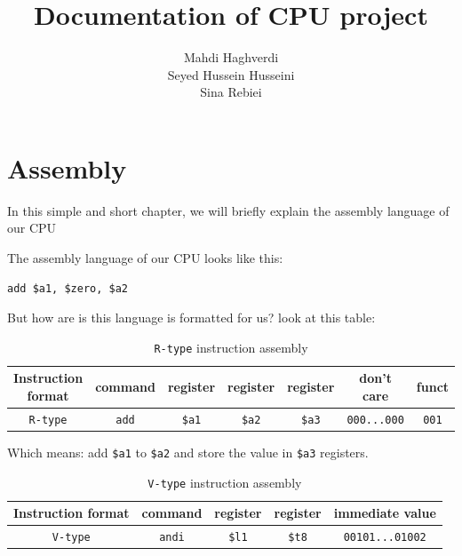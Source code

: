 \documentclass[12pt, dvipsnames, svgnames, x11names, oneside]{book}
\title{Documentation of CPU project}
\author{
Mahdi Haghverdi \\
Seyed Hussein Husseini \\
Sina Rebiei
}
\newenvironment{sansserif}{\sffamily}{\normalfont}
\begin{document}
\maketitle
\frontmatter
\tableofcontents
\mainmatter

\chapter{Assembly}
\begin{sansserif}
	In this simple and short chapter, we will briefly explain the assembly language of our CPU
\end{sansserif}

The assembly language of our CPU looks like this:

\begin{lstlisting}
add $a1, $zero, $a2	
\end{lstlisting}

But how are is this language is formatted for us?
look at this table:

\begin{table}[H]
\begin{adjustbox}{width=\textwidth}
\begin{tabular}{|c|c|c|c|c|c|c|}
\hline
Instruction format & command & register & register & register & don't care & funct \\
\hline
\texttt{R-type} & \texttt{add} & \texttt{\$a1} & \texttt{\$a2} & \texttt{\$a3} & \texttt{000...000} & \texttt{001}\\
\hline
\end{tabular}
\end{adjustbox}
\caption{\texttt{R-type} instruction assembly}
\end{table}

Which means: add \texttt{\$a1} to \texttt{\$a2} and store the value in \texttt{\$a3} registers.

\begin{table}[H]
\begin{adjustbox}{width=\textwidth}
\begin{tabular}{|c|c|c|c|c|}
\hline
Instruction format & command & register & register & immediate value \\
\hline
\hline
\texttt{V-type} & \texttt{andi} & \texttt{\$l1} & \texttt{\$t8} & \texttt{00101...01002} \\
\hline
\end{tabular}
\end{adjustbox}
\caption{\texttt{V-type} instruction assembly}
\end{table}
\end{document}

